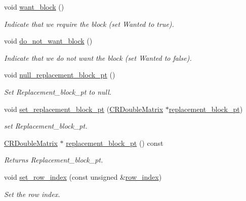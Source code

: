 \begin{DoxyCompactItemize}
void \hyperlink{classoomph_1_1BlockSelector_a2ac783d94aa3339ce43fc40e269ea628}{want\+\_\+block} ()
\begin{DoxyCompactList}\small\item\em Indicate that we require the block (set Wanted to true). \end{DoxyCompactList}\item 
void \hyperlink{classoomph_1_1BlockSelector_a2548e42fd02e258d46d0a4f74919f11a}{do\+\_\+not\+\_\+want\+\_\+block} ()
\begin{DoxyCompactList}\small\item\em Indicate that we do not want the block (set Wanted to false). \end{DoxyCompactList}\item 
void \hyperlink{classoomph_1_1BlockSelector_a0a9a7dd11c0dba9272d83bfc8b694482}{null\+\_\+replacement\+\_\+block\+\_\+pt} ()
\begin{DoxyCompactList}\small\item\em Set Replacement\+\_\+block\+\_\+pt to null. \end{DoxyCompactList}\item 
void \hyperlink{classoomph_1_1BlockSelector_af98391ac49a8717eb6b2fbe0995222be}{set\+\_\+replacement\+\_\+block\+\_\+pt} (\hyperlink{classoomph_1_1CRDoubleMatrix}{C\+R\+Double\+Matrix} $\ast$\hyperlink{classoomph_1_1BlockSelector_ad40b427ae3228721a702f5bf82b2b829}{replacement\+\_\+block\+\_\+pt})
\begin{DoxyCompactList}\small\item\em set Replacement\+\_\+block\+\_\+pt. \end{DoxyCompactList}\item 
\hyperlink{classoomph_1_1CRDoubleMatrix}{C\+R\+Double\+Matrix} $\ast$ \hyperlink{classoomph_1_1BlockSelector_ad40b427ae3228721a702f5bf82b2b829}{replacement\+\_\+block\+\_\+pt} () const
\begin{DoxyCompactList}\small\item\em Returns Replacement\+\_\+block\+\_\+pt. \end{DoxyCompactList}\item 
void \hyperlink{classoomph_1_1BlockSelector_ad0fb48a7b31189c891013bb5de6ba938}{set\+\_\+row\+\_\+index} (const unsigned \&\hyperlink{classoomph_1_1BlockSelector_abc7c527ed8c1080d98bddf2a1f3c1801}{row\+\_\+index})
\begin{DoxyCompactList}\small\item\em Set the row index. \end{DoxyCompactList}\item 

\end{DoxyCompactItemize}

